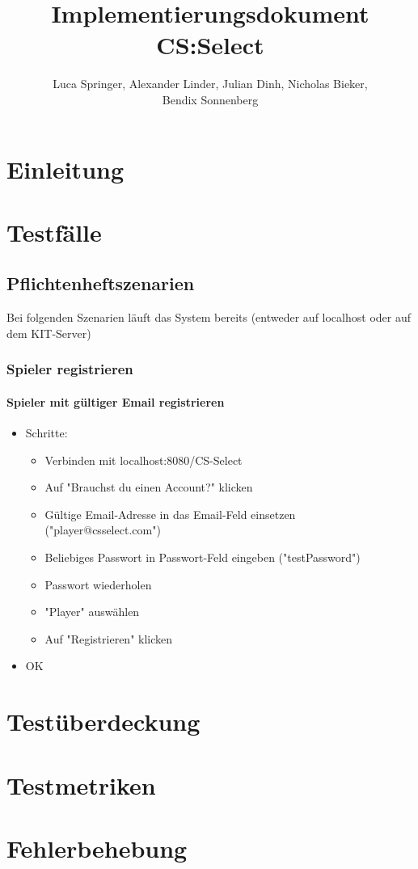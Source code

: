 \documentclass[a4paper]{scrreprt}
\begin{document}
    \title{Implementierungsdokument CS:Select}
    \author{Luca Springer, Alexander Linder, Julian Dinh, Nicholas Bieker,\\ Bendix Sonnenberg}
    \maketitle

    \tableofcontents
    \chapter{Einleitung}
    \chapter{Testfälle}
        \section{Pflichtenheftszenarien}
        Bei folgenden Szenarien läuft das System bereits (entweder auf localhost oder auf dem KIT-Server) \\
            \subsection{Spieler registrieren}
            \subsubsection{Spieler mit gültiger Email registrieren}
            \begin{itemize}
                \item Schritte:
                    \begin{itemize}
                        \item Verbinden mit localhost:8080/CS-Select
                        \item Auf "Brauchst du einen Account?" klicken
                        \item Gültige Email-Adresse in das Email-Feld einsetzen ("player@csselect.com")
                        \item Beliebiges Passwort in Passwort-Feld eingeben ("testPassword")
                        \item Passwort wiederholen
                        \item "Player" auswählen
                        \item Auf "Registrieren" klicken
                    \end{itemize}
                \item OK %
            \end{itemize}
    \chapter{Testüberdeckung}
    \chapter{Testmetriken}
    \chapter{Fehlerbehebung}
\end{document}
